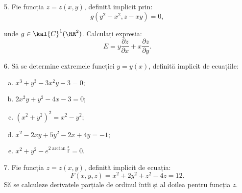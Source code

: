 \vspace{0.3cm}

5. Fie funcția $ z = z(x, y) $, definită implicit prin:
\[
  g(y^2 - x^2, z - xy) = 0,
\]

unde $ g \in \kal{C}^1(\RR^2) $. Calculați expresia:
\[
  E = y \dfrac{\partial z}{\partial x} + x \dfrac{\partial z}{\partial y}.
\]

\vspace{0.3cm}

6. Să se determine extremele funcției $ y = y(x) $, definită implicit
de ecuațiile:
\begin{enumerate}[(a)]
\item $ x^3 + y^3 - 3x^2y - 3 = 0 $;
\item $ 2x^2y + y^2 - 4x - 3 = 0 $;
\item $ (x^2 + y^2)^2 = x^2 - y^2 $;
\item $ x^2 - 2xy + 5y^2 - 2x + 4y = - 1 $;
\item $ x^2 + y^2 - e^{2 \arctan \frac{x}{y}} = 0 $.
\end{enumerate}

\vspace{0.3cm}

7. Fie funcția $ z = z(x, y) $, definită implicit de ecuația:
\[
  F(x, y, z) = x^2 + 2y^2 + z^2 - 4z = 12.
\]
Să se calculeze derivatele parțiale de ordinul întîi și al doilea
pentru funcția $ z $.


